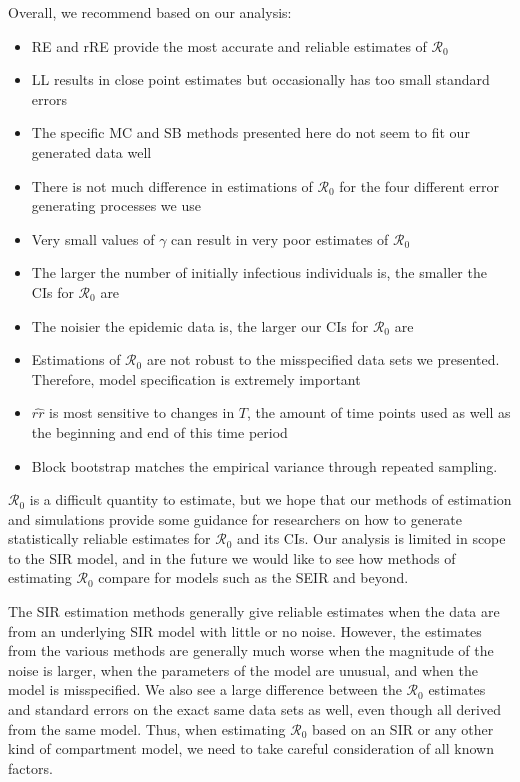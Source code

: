 \documentclass[12pt]{article}
\newcommand{\rr}{\ensuremath{\mathcal{R}_0}}
\begin{document}
Overall, we recommend based on our analysis:
\begin{itemize}
  \item RE and rRE provide the most accurate and reliable estimates of $\rr$
  \item LL results in close point estimates but occasionally has too small standard errors
  \item The specific MC and SB methods presented here do not seem to fit our generated data well
  \item There is not much difference in estimations of $\rr$ for the four different error generating processes we use
  \item Very small values of $\gamma$ can result in very poor estimates of $\rr$
  \item The larger the number of initially infectious individuals is, the smaller the CIs for $\rr$ are
  \item The noisier the epidemic data is, the larger our CIs for $\rr$ are
  \item Estimations of $\rr$ are not robust to the misspecified data sets we presented.  Therefore, model specification is extremely important
    \item $\hat{rr}$ is most sensitive to changes in $T$, the amount of time points used as well as the beginning and end of this time period
  \item Block bootstrap matches the empirical variance through repeated sampling.
  \end{itemize}

$\rr$ is a difficult quantity to estimate, but we hope that our methods of estimation and simulations provide some guidance for researchers on how to generate statistically reliable estimates for $\rr$ and its CIs.  Our analysis is limited in scope to the SIR model, and in the future we would like to see how methods of estimating $\rr$ compare for models such as the SEIR and beyond.






The SIR estimation methods generally give reliable estimates when the data are from an underlying SIR model with little or no noise. However, the estimates from the various methods are generally much worse when the magnitude of the noise is larger, when the parameters of the model are unusual, and when the model is misspecified. We also see a large difference between the $\rr$ estimates and standard errors on the exact same data sets as well, even though all derived from the same model. Thus, when estimating $\rr$ based on an SIR or any other kind of compartment model, we need to take careful consideration of all known factors.


\pagebreak




\appendix
\end{document}
